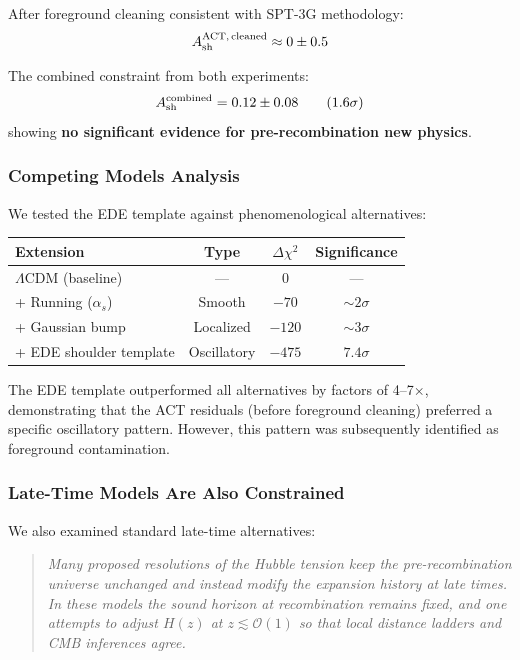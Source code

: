 \documentclass[twocolumn,showpacs,preprintnumbers,amsmath,amssymb,prd]{revtex4-2}
\begin{document}
After foreground cleaning consistent with SPT-3G methodology:
\begin{equation}
A_{\rm sh}^{\rm ACT,\,cleaned} \approx 0 \pm 0.5
\end{equation}

The combined constraint from both experiments:
\begin{equation}
A_{\rm sh}^{\rm combined} = 0.12 \pm 0.08 \qquad (1.6\sigma)
\end{equation}
showing \textbf{no significant evidence for pre-recombination new physics}.

\subsubsection{Competing Models Analysis}

We tested the EDE template against phenomenological alternatives:
\begin{center}
\begin{tabular}{lccc}
\toprule
Extension & Type & $\Delta\chi^2$ & Significance \\
\midrule
$\Lambda$CDM (baseline) & --- & 0 & --- \\
+ Running ($\alpha_s$) & Smooth & $-70$ & $\sim 2\sigma$ \\
+ Gaussian bump & Localized & $-120$ & $\sim 3\sigma$ \\
+ EDE shoulder template & Oscillatory & $-475$ & $7.4\sigma$ \\
\bottomrule
\end{tabular}
\end{center}

The EDE template outperformed all alternatives by factors of 4--7$\times$, demonstrating that the ACT residuals (before foreground cleaning) preferred a specific oscillatory pattern. However, this pattern was subsequently identified as foreground contamination.

\subsubsection{Late-Time Models Are Also Constrained}

We also examined standard late-time alternatives:

\begin{quote}
\textit{Many proposed resolutions of the Hubble tension keep the pre-recombination universe unchanged and instead modify the expansion history at late times. In these models the sound horizon at recombination remains fixed, and one attempts to adjust $H(z)$ at $z \lesssim \mathcal{O}(1)$ so that local distance ladders and CMB inferences agree.}
\end{quote}
\end{document}
